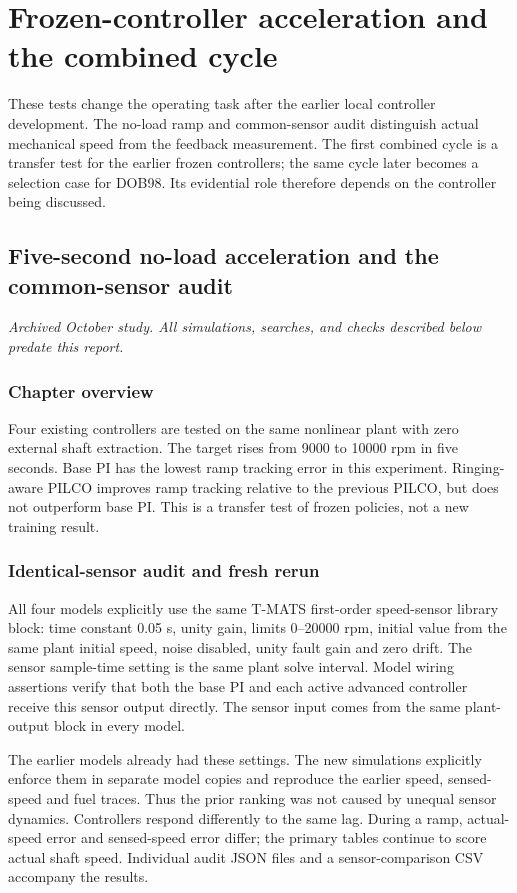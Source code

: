 \chapter{Frozen-controller acceleration and the combined cycle}
\label{ch:transfer}
These tests change the operating task after the earlier local controller development. The no-load ramp and common-sensor audit distinguish actual mechanical speed from the feedback measurement. The first combined cycle is a transfer test for the earlier frozen controllers; the same cycle later becomes a selection case for DOB98. Its evidential role therefore depends on the controller being discussed.

\section{Five-second no-load acceleration and the common-sensor audit}
\textit{Archived October study. All simulations, searches, and checks described below predate this report.}\par

\subsection*{Chapter overview}Four existing controllers are tested on the same nonlinear plant with zero external shaft extraction. The target rises from 9000 to 10000 rpm in five seconds. Base PI has the lowest ramp tracking error in this experiment. Ringing-aware PILCO improves ramp tracking relative to the previous PILCO, but does not outperform base PI. This is a transfer test of frozen policies, not a new training result.
\subsection{Identical-sensor audit and fresh rerun}
All four models explicitly use the same T-MATS first-order speed-sensor library block: time constant 0.05 s, unity gain, limits 0--20000 rpm, initial value from the same plant initial speed, noise disabled, unity fault gain and zero drift. The sensor sample-time setting is the same plant solve interval. Model wiring assertions verify that both the base PI and each active advanced controller receive this sensor output directly. The sensor input comes from the same plant-output block in every model.

The earlier models already had these settings. The new simulations explicitly enforce them in separate model copies and reproduce the earlier speed, sensed-speed and fuel traces. Thus the prior ranking was not caused by unequal sensor dynamics. Controllers respond differently to the same lag. During a ramp, actual-speed error and sensed-speed error differ; the primary tables continue to score actual shaft speed. Individual audit JSON files and a sensor-comparison CSV accompany the results.
